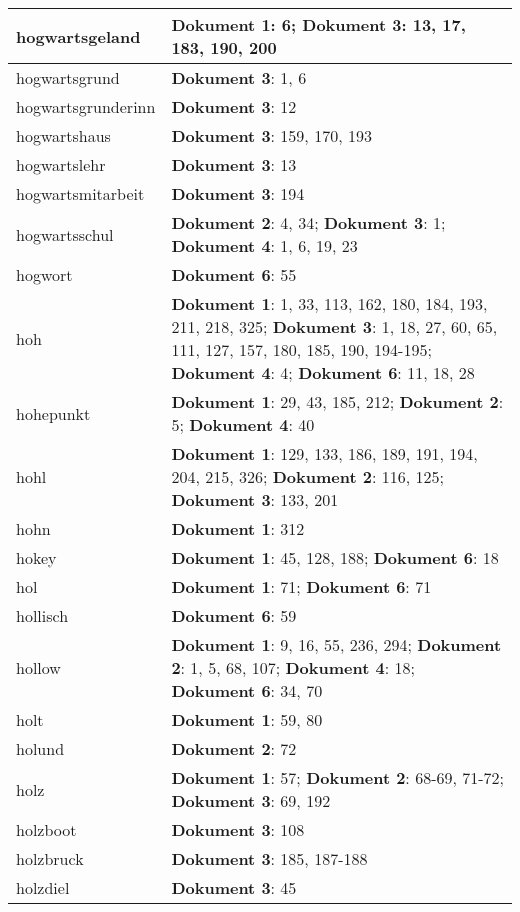 \documentclass[a5paper]{article}
\begin{document}
\begin{longtable}[l]{|l|p{3in}|}
\hline
hogwartsgeland & \textbf{Dokument 1}: 6; \textbf{Dokument 3}: 13, 17, 183, 190, 200 \\
\hline
hogwartsgrund & \textbf{Dokument 3}: 1, 6 \\
\hline
hogwartsgrunderinn & \textbf{Dokument 3}: 12 \\
\hline
hogwartshaus & \textbf{Dokument 3}: 159, 170, 193 \\
\hline
hogwartslehr & \textbf{Dokument 3}: 13 \\
\hline
hogwartsmitarbeit & \textbf{Dokument 3}: 194 \\
\hline
hogwartsschul & \textbf{Dokument 2}: 4, 34; \textbf{Dokument 3}: 1; \textbf{Dokument 4}: 1, 6, 19, 23 \\
\hline
hogwort & \textbf{Dokument 6}: 55 \\
\hline
hoh & \textbf{Dokument 1}: 1, 33, 113, 162, 180, 184, 193, 211, 218, 325; \textbf{Dokument 3}: 1, 18, 27, 60, 65, 111, 127, 157, 180, 185, 190, 194-195; \textbf{Dokument 4}: 4; \textbf{Dokument 6}: 11, 18, 28 \\
\hline
hohepunkt & \textbf{Dokument 1}: 29, 43, 185, 212; \textbf{Dokument 2}: 5; \textbf{Dokument 4}: 40 \\
\hline
hohl & \textbf{Dokument 1}: 129, 133, 186, 189, 191, 194, 204, 215, 326; \textbf{Dokument 2}: 116, 125; \textbf{Dokument 3}: 133, 201 \\
\hline
hohn & \textbf{Dokument 1}: 312 \\
\hline
hokey & \textbf{Dokument 1}: 45, 128, 188; \textbf{Dokument 6}: 18 \\
\hline
hol & \textbf{Dokument 1}: 71; \textbf{Dokument 6}: 71 \\
\hline
hollisch & \textbf{Dokument 6}: 59 \\
\hline
hollow & \textbf{Dokument 1}: 9, 16, 55, 236, 294; \textbf{Dokument 2}: 1, 5, 68, 107; \textbf{Dokument 4}: 18; \textbf{Dokument 6}: 34, 70 \\
\hline
holt & \textbf{Dokument 1}: 59, 80 \\
\hline
holund & \textbf{Dokument 2}: 72 \\
\hline
holz & \textbf{Dokument 1}: 57; \textbf{Dokument 2}: 68-69, 71-72; \textbf{Dokument 3}: 69, 192 \\
\hline
holzboot & \textbf{Dokument 3}: 108 \\
\hline
holzbruck & \textbf{Dokument 3}: 185, 187-188 \\
\hline
holzdiel & \textbf{Dokument 3}: 45 \\
\hline

\end{longtable}
\end{document}

